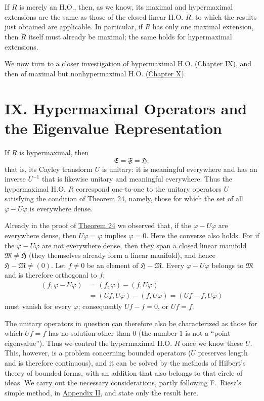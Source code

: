 ﻿\documentclass[paper=b5,fontsize=13pt,bookmarkpackage=false,twoside]{scrartcl}
\begin{document}
If $R$ is merely an H.O., then, as we know, its maximal and hypermaximal extensions are the same as those of the closed linear H.O. $\widetilde R$, to which the results just obtained are applicable. In particular, if $R$ has only one maximal extension, then $\widetilde R$ itself must already be maximal; the same holds for hypermaximal extensions.

We now turn to a closer investigation of hypermaximal H.O. (\hyperref[chap:IX]{Chapter IX}), and then of maximal but nonhypermaximal H.O. (\hyperref[chap:X]{Chapter X}).

\section*{IX. Hypermaximal Operators and the Eigenvalue Representation}\label{chap:IX}

If $R$ is hypermaximal, then
\[
\mathfrak E=\mathfrak F=\mathfrak H;
\]
that is, its Cayley transform $U$ is unitary: it is meaningful everywhere and has an inverse $U^{-1}$ that is likewise unitary and meaningful everywhere. Thus the hypermaximal H.O. $R$ correspond one-to-one to the unitary operators $U$ satisfying the condition of \hyperref[thm:24]{Theorem 24}, namely, those for which the set of all $\varphi-U\varphi$ is everywhere dense.

Already in the proof of \hyperref[thm:24]{Theorem 24} we observed that, if the $\varphi-U\varphi$ are everywhere dense, then $U\varphi=\varphi$ implies $\varphi=0$. Here the converse also holds. For if the $\varphi-U\varphi$ are not everywhere dense, then they span a closed linear manifold $\mathfrak M\ne\mathfrak H$ (they themselves already form a linear manifold), and hence $\mathfrak H-\mathfrak M\ne(0)$. Let $f\ne0$ be an element of $\mathfrak H-\mathfrak M$. Every $\varphi-U\varphi$ belongs to $\mathfrak M$ and is therefore orthogonal to $f$:
\begin{align*}
(f,\varphi-U\varphi)
&=(f,\varphi)-(f,U\varphi)\\
&=(Uf,U\varphi)-(f,U\varphi)
=(Uf-f,U\varphi)
\end{align*}
must vanish for every $\varphi$; consequently $Uf-f=0$, or $Uf=f$.

The unitary operators in question can therefore also be characterized as those for which $Uf=f$ has no solution other than $0$ (the number $1$ is not a ``point eigenvalue''). Thus we control the hypermaximal H.O. $R$ once we know these $U$. This, however, is a problem concerning bounded operators ($U$ preserves length and is therefore continuous), and it can be solved by the methods of Hilbert's theory of bounded forms, with an addition that also belongs to that circle of ideas. We carry out the necessary considerations, partly following F.~Riesz's simple method, in \hyperref[app:II]{Appendix II}, and state only the result here.
\end{document}
